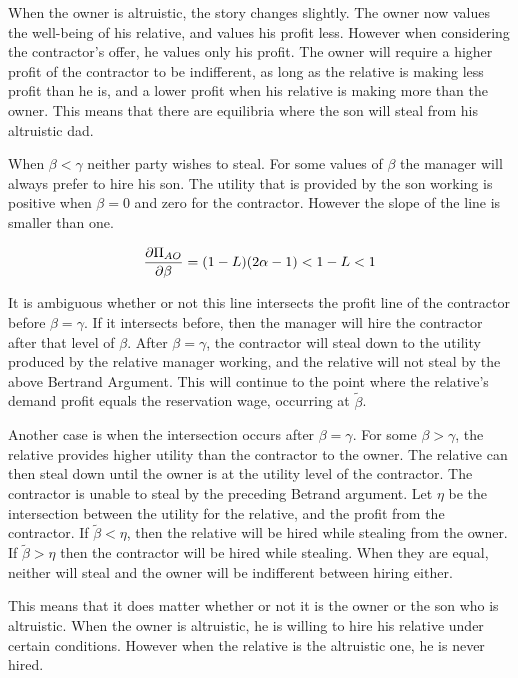 \documentclass[12pt]{paper}
\begin{document}
When the owner is altruistic, the story changes slightly. The owner
now values the well-being of his relative, and values his profit
less. However when considering the contractor's offer, he values only
his profit. The owner will require a higher profit of the contractor
to be indifferent, as long as the relative is making less profit than
he is, and a lower profit when his relative is making more than the
owner. This means that there are equilibria where the son will steal
from his altruistic dad.


When $\beta < \gamma$ neither party wishes to steal. For some values of $\beta$ the
manager will always prefer to hire his son. The utility that is
provided by the son working is positive when $\beta = 0$ and zero for the
contractor. However the slope of the line is smaller than one.

\begin{equation*}
  \frac{ \partial \Pi_{AO}}{ \partial \beta} = (1-L)(2\alpha-1) < 1-L < 1
\end{equation*}

It is ambiguous whether or not this line intersects the profit line of
the contractor before $\beta = \gamma$. If it intersects before, then the
manager will hire the contractor after that level of $\beta$. After $\beta =
\gamma$, the contractor will steal down to the utility produced by the
relative manager working, and the relative will not steal by the above
Bertrand Argument. This will continue to the point where the
relative's demand profit equals the reservation wage, occurring at
$\tilde{\beta}$. 

Another case is when the intersection occurs after $\beta = \gamma$. For some
$\beta > \gamma$, the relative provides higher utility than the contractor to
the owner. The relative can then steal down until the owner is at the
utility level of the contractor. The contractor is unable to steal by
the preceding Betrand argument. Let $\eta$ be the intersection between
the utility for the relative, and the profit from the contractor. If
$\tilde{\beta} < \eta$, then the relative will be hired while stealing from
the owner. If $ \tilde{\beta} > \eta$ then the contractor will be hired while
stealing. When they are equal, neither will steal and the owner will
be indifferent between hiring either. 

This means that it does matter whether or not it is the owner or the
son who is altruistic. When the owner is altruistic, he is willing to
hire his relative under certain conditions. However when the relative
is the altruistic one, he is never hired. 
\end{document}
